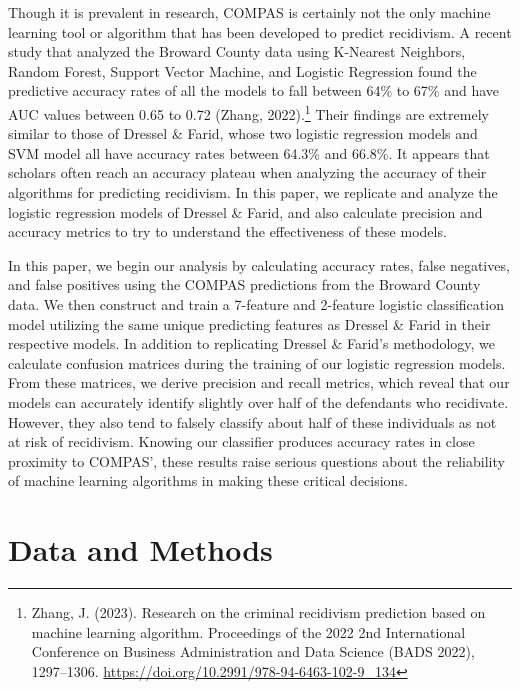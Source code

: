 \documentclass[12pt, ]{article}
\begin{document}
Though it is prevalent in research, COMPAS is certainly not the only
machine learning tool or algorithm that has been developed to predict
recidivism. A recent study that analyzed the Broward County data using
K-Nearest Neighbors, Random Forest, Support Vector Machine, and Logistic
Regression found the predictive accuracy rates of all the models to fall
between 64\% to 67\% and have AUC values between 0.65 to 0.72 (Zhang,
2022).\footnote{Zhang, J. (2023). Research on the criminal recidivism
  prediction based on machine learning algorithm. Proceedings of the
  2022 2nd International Conference on Business Administration and Data
  Science (BADS 2022), 1297--1306.
  \url{https://doi.org/10.2991/978-94-6463-102-9_134}} Their findings
are extremely similar to those of Dressel \& Farid, whose two logistic
regression models and SVM model all have accuracy rates between 64.3\%
and 66.8\%. It appears that scholars often reach an accuracy plateau
when analyzing the accuracy of their algorithms for predicting
recidivism. In this paper, we replicate and analyze the logistic
regression models of Dressel \& Farid, and also calculate precision and
accuracy metrics to try to understand the effectiveness of these models.

In this paper, we begin our analysis by calculating accuracy rates,
false negatives, and false positives using the COMPAS predictions from
the Broward County data. We then construct and train a 7-feature and
2-feature logistic classification model utilizing the same unique
predicting features as Dressel \& Farid in their respective models. In
addition to replicating Dressel \& Farid's methodology, we calculate
confusion matrices during the training of our logistic regression
models. From these matrices, we derive precision and recall metrics,
which reveal that our models can accurately identify slightly over half
of the defendants who recidivate. However, they also tend to falsely
classify about half of these individuals as not at risk of recidivism.
Knowing our classifier produces accuracy rates in close proximity to
COMPAS', these results raise serious questions about the reliability of
machine learning algorithms in making these critical decisions.

\hypertarget{data-and-methods}{%
\section{Data and Methods}\label{data-and-methods}}
\end{document}
